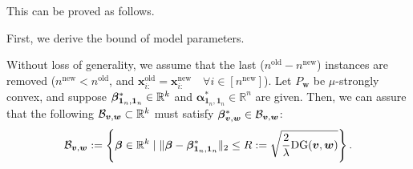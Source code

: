  This can be proved as follows.

 First, we derive the bound of model parameters.

\begin{lemma}
Without loss of generality, we assume that the last ($n^{\mathrm{old}} - n^{\mathrm{new}}$) instances are removed ($n^{\mathrm{new}} < n^{\mathrm{old}}$, and $\bm{x}_{i:}^{\mathrm{old}} = \bm{x}_{i:}^{\mathrm{new}} \quad \forall i \in [n^{\mathrm{new}}]$). Let $P_{\boldsymbol{w}}$ be $\mu$-strongly convex, and suppose $\bm \beta_{\bm 1_n, \bm 1_n}^{*} \in \mathbb{R}^{k}$ and $\bm \alpha_{\bm 1_n, \bm 1_n}^{*} \in \mathbb{R}^n$ are given.
%
Then, we can assure that the following ${\cal B}_{\bm{v}, \bm{w}} \subset \mathbb{R}^k$ must satisfy $\bm \beta_{\bm v, \bm w}^{*} \in {\cal B}_{\bm{v}, \bm{w}}$:
\begin{equation}
	\label{eq:bound}
	\begin{aligned}
		{\cal B}_{\bm{v}, \bm{w}} :=\left\{\bm{\beta} \in \mathbb{R}^k \mid\|\bm{\beta}-\bm \beta_{\bm 1_n, \bm 1_n}^{*}\|_2 \leq R := \sqrt{\frac{2}{\lambda}{\rm DG}(\bm v, \bm w)} \right\}.
	\end{aligned}
\end{equation}
\end{lemma}

